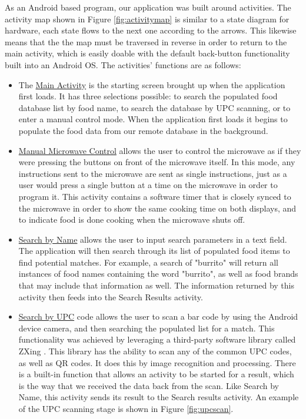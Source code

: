 \documentclass[10pt,journal,letterpaper,twocolumn]{IEEEtran}
\begin{document}
As an Android based program, our application was built around activities.  The activity map shown in Figure \ref{fig:activitymap} is similar to a state diagram for hardware, each state flows to the next one according to the arrows.  This likewise means that the the map must be traversed in reverse in order to return to the main activity, which is easily doable with the default back-button functionality built into an Android OS.  The activities' functions are as follows:
\begin{itemize}
	\item The \underline{Main Activity} is the starting screen brought up when the application first loads.  It has three selections possible: to search the populated food database list by food name, to search the database by UPC scanning, or to enter a manual control mode. When the application first loads it begins to populate the food data from our remote database in the background.
    \item \underline{Manual Microwave Control} allows the user to control the microwave as if they were pressing the buttons on front of the microwave itself.  In this mode, any instructions sent to the microwave are sent as single instructions, just as a user would press a single button at a time on the microwave in order to program it.  This activity contains a software timer that is closely synced to the microwave in order to show the same cooking time on both displays, and to indicate food is done cooking when the microwave shuts off.
    \item \underline{Search by Name} allows the user to input search parameters in a text field.  The application will then search through its list of populated food items to find potential matches.  For example, a search of "burrito" will return all instances of food names containing the word "burrito", as well as food brands that may include that information as well.  The information returned by this activity then feeds into the Search Results activity.
    \item \underline{Search by UPC} code allows the user to scan a bar code by using the Android device camera, and then searching the populated list for a match.  This functionality was achieved by leveraging a third-party software library called ZXing \cite{upcScanningLibrary}. This library has the ability to scan any of the common UPC codes, as well as QR codes. It does this by image recognition and processing. There is a built-in function that allows an activity to be started for a result, which is the way that we received the data back from the scan. Like Search by Name, this activity sends its result to the Search results activity.  An example of the UPC scanning stage is shown in Figure \ref{fig:upcscan}.


\end{itemize}
\end{document}
